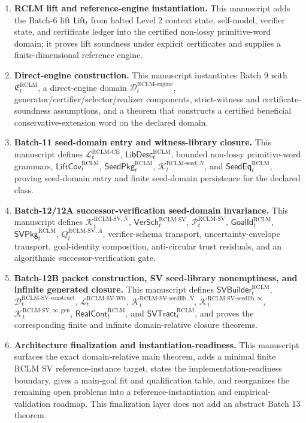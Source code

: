 \documentclass[11pt,a4paper]{article}
\newcommand{\Lcal}{\mathcal L}
\newcommand{\Pcal}{\mathcal P}
\newcommand{\Kcal}{\mathcal K}
\newcommand{\Dcal}{\mathcal D}
\newcommand{\RCLM}{\mathrm{RCLM}}
\newcommand{\engine}{\mathrm{engine}}
\newcommand{\CE}{\mathrm{CE}}
\begin{document}
\begin{enumerate}[label=(\arabic*),leftmargin=1.5em]
    \item \textbf{RCLM lift and reference-engine instantiation.} This manuscript adds the Batch-6 lift \(\mathsf{Lift}_t\) from halted Level 2 context state, self-model, verifier state, and certificate ledger into the certified non-lossy primitive-word domain; it proves lift soundness under explicit certificates and supplies a finite-dimensional reference engine.
    \item \textbf{Direct-engine construction.} This manuscript instantiates Batch 9 with \(\mathfrak E_t^{\RCLM}\), a direct-engine domain \(\Dcal_t^{\RCLM\text{-}\engine}\), generator/certifier/selector/realizer components, strict-witness and certificate-soundness assumptions, and a theorem that constructs a certified beneficial conservative-extension word on the declared domain.
    \item \textbf{Batch-11 seed-domain entry and witness-library closure.} This manuscript defines \(\Lcal_t^{\RCLM\text{-}\CE}\), \(\mathsf{LibDesc}_t^{\RCLM}\), bounded non-lossy primitive-word grammars, \(\mathsf{LiftCov}_t^{\RCLM}\), \(\mathsf{SeedPkg}_t^{\RCLM}\), \(\Kcal_t^{\RCLM\text{-}\mathrm{seed},N}\), and \(\mathsf{SeedEq}_t^{\RCLM}\), proving seed-domain entry and finite seed-domain persistence for the declared class.
    \item \textbf{Batch-12/12A successor-verification seed-domain invariance.} This manuscript defines \(\Kcal_t^{\RCLM\text{-}\mathrm{SV},N}\), \(\mathsf{VerSch}_t^{\RCLM\text{-}\mathrm{SV}}\), \(\Pcal_t^{\RCLM\text{-}\mathrm{SV}}\), \(\mathsf{GoalId}_t^{\RCLM}\), \(\mathsf{SVPkg}_t^{\RCLM}\), \(Q_t^{\RCLM\text{-}\mathrm{SV},A}\), verifier-schema transport, uncertainty-envelope transport, goal-identity composition, anti-circular trust residuals, and an algorithmic successor-verification gate.
    \item \textbf{Batch-12B packet construction, SV seed-library nonemptiness, and infinite generated closure.} This manuscript defines \(\mathsf{SVBuilder}_t^{\RCLM}\), \(\Dcal_t^{\RCLM\text{-}\mathrm{SV\mbox{-}construct}}\), \(\Lcal_t^{\RCLM\text{-}\mathrm{SV\mbox{-}Wit}}\), \(\Kcal_t^{\RCLM\text{-}\mathrm{SV\mbox{-}seedlib},N}\), \(\Kcal_t^{\RCLM\text{-}\mathrm{SV\mbox{-}seedlib},\infty}\), \(\Kcal_t^{\RCLM\text{-}\mathrm{SV},\infty,\mathrm{gen}}\), \(\mathsf{RealCont}_t^{\RCLM}\), and \(\mathsf{SVTract}_t^{\RCLM}\), and proves the corresponding finite and infinite domain-relative closure theorems.
    \item \textbf{Architecture finalization and instantiation-readiness.} This manuscript surfaces the exact domain-relative main theorem, adds a minimal finite RCLM SV reference-instance target, states the implementation-readiness boundary, gives a main-goal fit and qualification table, and reorganizes the remaining open problems into a reference-instantiation and empirical-validation roadmap.  This finalization layer does not add an abstract Batch 13 theorem.

\end{enumerate}
\end{document}
